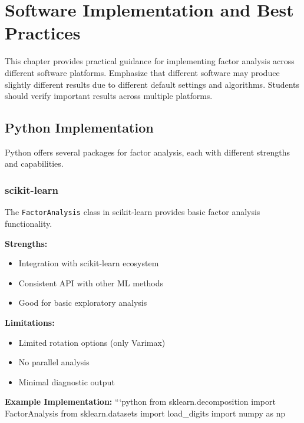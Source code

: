 \documentclass[a4paper]{tufte-book}
\begin{document}

\chapter{Software Implementation and Best Practices}

\begin{pedagogicalnote}
This chapter provides practical guidance for implementing factor analysis across different software platforms. Emphasize that different software may produce slightly different results due to different default settings and algorithms. Students should verify important results across multiple platforms.
\end{pedagogicalnote}

\section{Python Implementation}

Python offers several packages for factor analysis, each with different strengths and capabilities.

\subsection{scikit-learn}

The \texttt{FactorAnalysis} class in scikit-learn provides basic factor analysis functionality.

\textbf{Strengths:}
\begin{itemize}
\item Integration with scikit-learn ecosystem
\item Consistent API with other ML methods
\item Good for basic exploratory analysis
\end{itemize}

\textbf{Limitations:}
\begin{itemize}
\item Limited rotation options (only Varimax)
\item No parallel analysis
\item Minimal diagnostic output
\end{itemize}

\textbf{Example Implementation:}
```python
from sklearn.decomposition import FactorAnalysis
from sklearn.datasets import load_digits
import numpy as np
\end{document}

